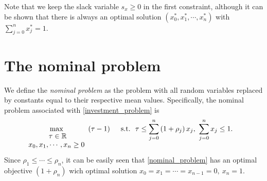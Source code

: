 \documentclass[11pt]{article}
\begin{document}
Note that we keep the slack variable $s_x \geq 0$ in the first constraint, although it can be shown that there is always an optimal solution $\left(x_0^*, x_1^*, \cdots, x_n^*\right)$ with $\sum_{j=0}^n x_j^* = 1$.

\section*{The nominal problem}
We define the \textit{nominal problem} as the problem with all random variables replaced by constants equal to their respective mean values. Specifically, the nominal problem associated with \eqref{investment_problem} is
\begin{align}\label{nominal_problem}
& \max_{\begin{matrix}\
	\tau \in \mathbb{R} \\
	x_0, x_1, \cdots, x_n \geq 0
	\end{matrix}}\ \left(\tau - 1\right)\ \ \ \ \textnormal{s.t.}\ \ \tau \leq \sum_{j=0}^n \left(1+\rho_j\right) x_j,\  \sum_{j=0}^n x_j \leq 1.
\end{align}
Since $\rho_1 \leq \cdots \leq \rho_n$,  it can be easily seen that \eqref{nominal_problem} has an optimal objective $(1+\rho_n)$ wich optimal solution $x_0 = x_1 = \cdots = x_{n-1}=0,\ x_n=1$.

{}

\end{document}
